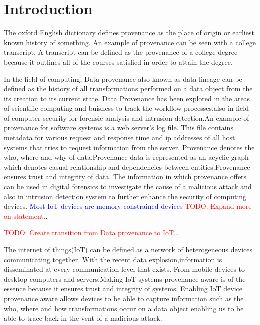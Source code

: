 \chapter{Introduction}\label{chapter:introduction}
The oxford English dictionary defines provenance as the place of origin or earliest known history of something. An example of provenance can be seen with a college transcript. A transcript can be defined as the provenance of a college degree because it outlines all of the courses satisfied in order to attain the degree.

\par In the field of computing, Data provenance also known as data lineage can be defined as the history of all transformations performed on a data object from the its creation to its current state. Data Provenance has been explored in the areas of scientific computing and buisness to track the workflow processes,also in field of computer security for forensic analysis and intrusion detection.An example of provenance for software systems is a web server's log file. This file contains metadata for various request and response time and ip addresses of all host systems that tries to request information from the server. Provenance denotes the who, where and why of data.Provenance data is represented as an acyclic graph which denotes casual relationship and dependencies between entities.Provenance ensures trust and integrity of data. The information in which provenance offers can be used in digital forensics to investigate the cause of a malicious attack and also in intrusion detection system to further enhance the security of computing devices.  \textcolor{blue}{Most IoT devices are memory constrained devices} \textcolor{red}{TODO: Expand more on statement.}.

 
\textcolor{red}{TODO: Create transition from Data provenance to IoT...}


The internet of things(IoT) can be defined as a network of heterogeneous devices communicating together. With the recent data explosion,information is disseminated at every communication level that exists. From mobile devices to desktop computers and servers.Making IoT systems provenance aware is of the essence because it ensures trust and  integrity of systems. Enabling IoT device provenance aware allows devices to be able to capture information such as the who, where and how transformations occur on a data object enabling us to be able to trace back in the vent of a malicious attack.



